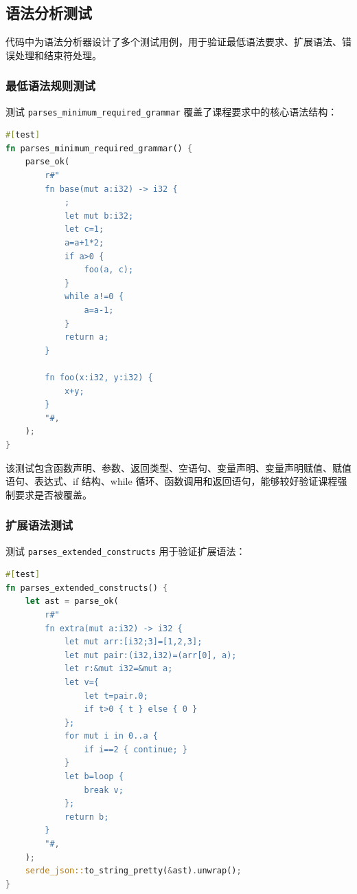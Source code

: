 \documentclass[UTF8,a4paper,12pt]{ctexart}
\begin{document}
\subsection{语法分析测试}

代码中为语法分析器设计了多个测试用例，用于验证最低语法要求、扩展语法、错误处理和结束符处理。

\subsubsection{最低语法规则测试}

测试 \texttt{parses\_minimum\_required\_grammar} 覆盖了课程要求中的核心语法结构：

\begin{lstlisting}[language=Rust,caption={最低语法规则测试示例}]
#[test]
fn parses_minimum_required_grammar() {
    parse_ok(
        r#"
        fn base(mut a:i32) -> i32 {
            ;
            let mut b:i32;
            let c=1;
            a=a+1*2;
            if a>0 {
                foo(a, c);
            }
            while a!=0 {
                a=a-1;
            }
            return a;
        }

        fn foo(x:i32, y:i32) {
            x+y;
        }
        "#,
    );
}
\end{lstlisting}

该测试包含函数声明、参数、返回类型、空语句、变量声明、变量声明赋值、赋值语句、表达式、if 结构、while 循环、函数调用和返回语句，能够较好验证课程强制要求是否被覆盖。

\subsubsection{扩展语法测试}

测试 \texttt{parses\_extended\_constructs} 用于验证扩展语法：

\begin{lstlisting}[language=Rust,caption={扩展语法测试示例}]
#[test]
fn parses_extended_constructs() {
    let ast = parse_ok(
        r#"
        fn extra(mut a:i32) -> i32 {
            let mut arr:[i32;3]=[1,2,3];
            let mut pair:(i32,i32)=(arr[0], a);
            let r:&mut i32=&mut a;
            let v={
                let t=pair.0;
                if t>0 { t } else { 0 }
            };
            for mut i in 0..a {
                if i==2 { continue; }
            }
            let b=loop {
                break v;
            };
            return b;
        }
        "#,
    );
    serde_json::to_string_pretty(&ast).unwrap();
}
\end{lstlisting}
\end{document}
